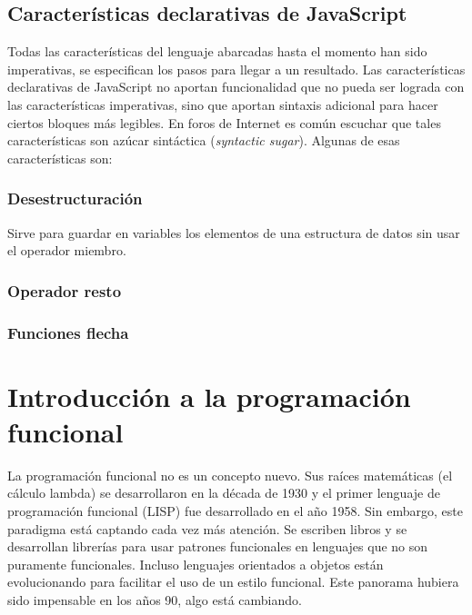 \documentclass{article}
\newcommand{\codejs}[1]{\tcbox{\lstinline[style=ES6]{#1}}}
\begin{document}
\subsection{Características declarativas de JavaScript}
Todas las características del lenguaje abarcadas hasta el momento han sido imperativas, se especifican los pasos para llegar a un resultado. Las características declarativas de JavaScript no aportan funcionalidad que no pueda ser lograda con las características imperativas, sino que aportan sintaxis adicional para hacer ciertos bloques más legibles. En foros de Internet es común escuchar que tales características son azúcar sintáctica (\textit{syntactic sugar}). Algunas de esas características son:

\subsubsection{Desestructuración}
Sirve para guardar en variables los elementos de una estructura de datos sin usar el operador miembro.

\subsubsection{Operador resto \codejs{...}}

\subsubsection{Funciones flecha}


\section{Introducción a la programación funcional}
\label{sec:fp-intro}
La programación funcional no es un concepto nuevo. Sus raíces matemáticas (el cálculo lambda) se desarrollaron en la década de 1930 y el primer lenguaje de programación funcional (LISP) fue desarrollado en el año 1958. Sin embargo, este paradigma está captando cada vez más atención. Se escriben libros y se desarrollan librerías para usar patrones funcionales en lenguajes que no son puramente funcionales. Incluso lenguajes orientados a objetos están evolucionando para facilitar el uso de un estilo funcional. Este panorama hubiera sido impensable en los años 90, algo está cambiando.\cite{why-isnt-fp-norm}
\end{document}
